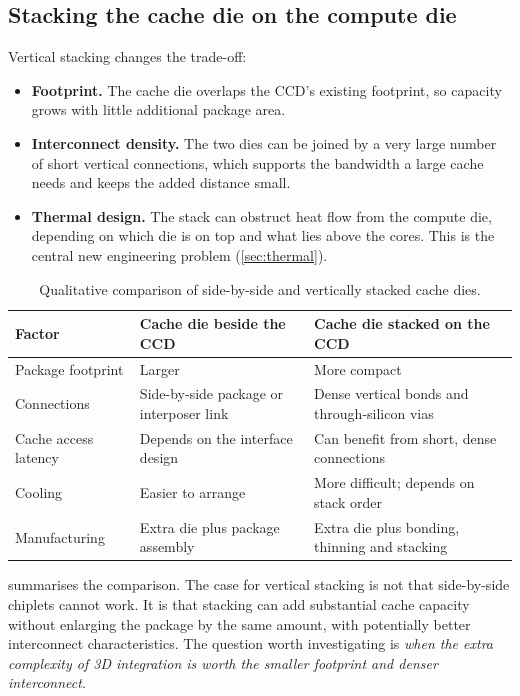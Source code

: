 \subsection{Stacking the cache die on the compute die}
Vertical stacking changes the trade-off:
\begin{itemize}
  \item \textbf{Footprint.} The cache die overlaps the CCD's existing footprint, so capacity grows with little additional package area.
  \item \textbf{Interconnect density.} The two dies can be joined by a very large number of short vertical connections, which supports the bandwidth a large cache needs and keeps the added distance small.
  \item \textbf{Thermal design.} The stack can obstruct heat flow from the compute die, depending on which die is on top and what lies above the cores. This is the central new engineering problem (\cref{sec:thermal}).
\end{itemize}

\begin{table}[htbp]
  \centering
  \caption[Qualitative comparison of side-by-side and vertically stacked cache dies]{Qualitative comparison of side-by-side and vertically stacked cache dies.}
  \label{tab:horizontal-vs-vertical}
  \small
  \begin{tabularx}{\textwidth}{@{}>{\raggedright\arraybackslash}p{3.1cm}>{\raggedright\arraybackslash}X>{\raggedright\arraybackslash}X@{}}
    \toprule
    \textbf{Factor} & \textbf{Cache die beside the CCD} & \textbf{Cache die stacked on the CCD} \\
    \midrule
    Package footprint & Larger & More compact \\
    Connections & Side-by-side package or interposer link & Dense vertical bonds and through-silicon vias \\
    Cache access latency & Depends on the interface design & Can benefit from short, dense connections \\
    Cooling & Easier to arrange & More difficult; depends on stack order \\
    Manufacturing & Extra die plus package assembly & Extra die plus bonding, thinning and stacking \\
    \bottomrule
  \end{tabularx}
\end{table}

 summarises the comparison. The case for vertical stacking is not that side-by-side chiplets cannot work. It is that stacking can add substantial cache capacity without enlarging the package by the same amount, with potentially better interconnect characteristics. The question worth investigating is \emph{when the extra complexity of 3D integration is worth the smaller footprint and denser interconnect}.

